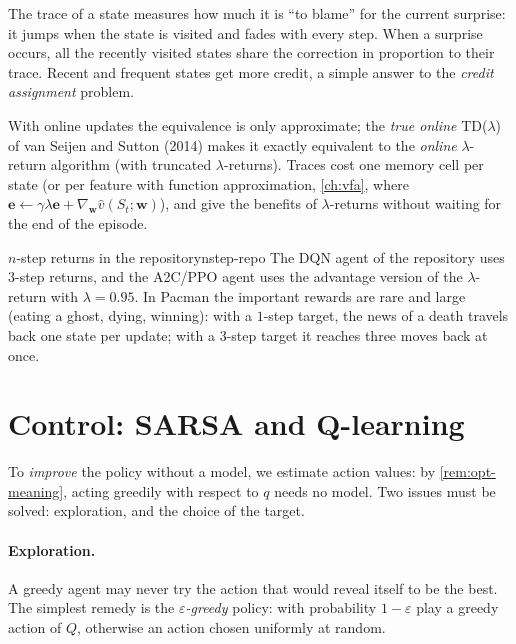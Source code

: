 \begin{intuition}
  The trace of a state measures how much it is ``to blame'' for the
  current surprise: it jumps when the state is visited and fades with
  every step. When a surprise occurs, all the recently visited states share
  the correction in proportion to their trace. Recent and frequent states
  get more credit, a simple answer to the \emph{credit assignment} problem.
\end{intuition}

With online updates the equivalence is only approximate; the \emph{true
online} TD($\lambda$) of van Seijen and Sutton (2014) makes it exactly
equivalent to the \emph{online} $\lambda$-return algorithm (with truncated
$\lambda$-returns). Traces cost one memory cell per state (or per feature
with function approximation, \cref{ch:vfa}, where $\mathbf{e} \gets
\gamma \lambda \mathbf{e} + \nabla_{\mathbf{w}} \hat v(S_t;
\mathbf{w})$), and give the benefits of $\lambda$-returns without
waiting for the end of the episode.

\begin{pacman}{$n$-step returns in the repository}{nstep-repo}
  The DQN agent of the repository uses $3$-step returns, and the A2C/PPO
  agent uses the advantage version of the $\lambda$-return with
  $\lambda = 0.95$. In Pacman the important rewards are rare and large
  (eating a ghost, dying, winning): with a $1$-step target, the news of a
  death travels back one state per update; with a $3$-step target it
  reaches three moves back at once.
\end{pacman}

\section{Control: SARSA and Q-learning}

To \emph{improve} the policy without a model, we estimate action values:
by \cref{rem:opt-meaning}, acting greedily with respect to $q$ needs no
model. Two issues must be solved: exploration, and the choice of the
target.

\paragraph{Exploration.} A greedy agent may never try the action that would
reveal itself to be the best. The simplest remedy is the
\emph{$\varepsilon$-greedy} policy: with probability $1 - \varepsilon$ play
a greedy action of $Q$, otherwise an action chosen uniformly at random.


